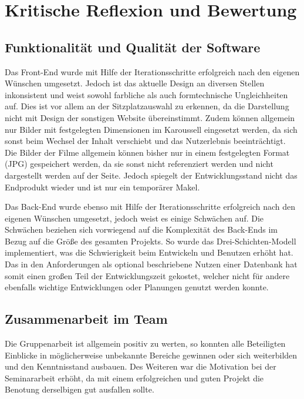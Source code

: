 \section{Kritische Reflexion und Bewertung}
\multipleauthorsection{\authorRF}{\authorEJ}

\subsection{Funktionalität und Qualität der Software}
\authorsection{\authorRF}

Das Front-End wurde mit Hilfe der Iterationsschritte erfolgreich nach den eigenen Wünschen umgesetzt.
Jedoch ist das aktuelle Design an diversen Stellen inkonsistent und weist sowohl farbliche als auch formtechnische Ungleichheiten auf.
Dies ist vor allem an der Sitzplatzauswahl zu erkennen, da die Darstellung nicht mit Design der sonstigen Website übereinstimmt.
Zudem können allgemein nur Bilder mit festgelegten Dimensionen im Karoussell eingesetzt werden, da sich sonst beim Wechsel der Inhalt verschiebt und das Nutzerlebnis beeinträchtigt.
Die Bilder der Filme allgemein können bisher nur in einem festgelegten Format (JPG) gespeichert werden, da sie sonst nicht referenziert werden und nicht dargestellt werden auf der Seite.
Jedoch spiegelt der Entwicklungsstand nicht das Endprodukt wieder und ist nur ein temporärer Makel.

Das Back-End wurde ebenso mit Hilfe der Iterationsschritte erfolgreich nach den eigenen Wünschen umgesetzt, jedoch weist es einige Schwächen auf.
Die Schwächen beziehen sich vorwiegend auf die Komplexität des Back-Ends im Bezug auf die Größe des gesamten Projekts.
So wurde das Drei-Schichten-Modell implementiert, was die Schwierigkeit beim Entwickeln und Benutzen erhöht hat.
Das in den Anforderungen als optional beschriebene Nutzen einer Datenbank hat somit einen großen Teil der Entwicklungszeit gekostet, welcher nicht für andere ebenfalls wichtige Entwicklungen oder Planungen genutzt werden konnte.

\subsection{Zusammenarbeit im Team}
\multipleauthorsection{\authorRF}{\authorEJ}

Die Gruppenarbeit ist allgemein positiv zu werten, so konnten alle Beteiligten Einblicke in möglicherweise unbekannte Bereiche gewinnen oder sich weiterbilden und den Kenntnisstand ausbauen.
Des Weiteren war die Motivation bei der Seminararbeit erhöht, da mit einem erfolgreichen und guten Projekt die Benotung derselbigen gut ausfallen sollte.

